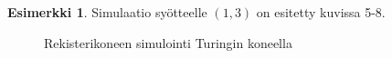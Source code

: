 \documentclass[a4paper, 12pt]{article}
\theoremstyle{definition}
\newtheorem{example}[mydef]{Esimerkki}
\theoremstyle{plain}
\begin{document}
\begin{example}
Simulaatio syötteelle $(1, 3)$ on esitetty kuvissa 5-8.

\begin{figure}[tb] 
\centering
{}
\caption{Rekisterikoneen simulointi Turingin koneella}
\end{figure}
\begin{figure}[tb] 
\centering

\end{figure}
\end{example}
\end{document}
